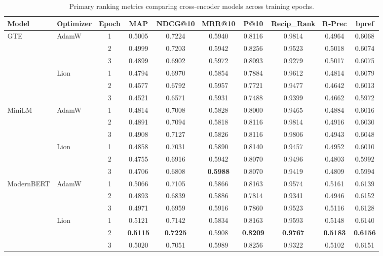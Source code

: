 \documentclass[conference]{IEEEtran}
\begin{document}
\begin{table}[t]
\centering
\caption{Primary ranking metrics comparing cross-encoder models across training epochs.}
\label{tab:primary_metrics}
\small
\begin{tabular}{llcccccccc}
\toprule
\textbf{Model} & \textbf{Optimizer} & \textbf{Epoch} & \textbf{MAP} & \textbf{NDCG@10} & \textbf{MRR@10} & \textbf{P@10} & \textbf{Recip\_Rank} & \textbf{R-Prec} & \textbf{bpref} \\
\midrule
\multirow{6}{*}{GTE} & \multirow{3}{*}{AdamW} 
 & 1 & 0.5005 & 0.7224 & 0.5940 & 0.8116 & 0.9814 & 0.4964 & 0.6068 \\
 & & 2 & 0.4999 & 0.7203 & 0.5942 & 0.8256 & 0.9523 & 0.5018 & 0.6074 \\
 & & 3 & 0.4899 & 0.6902 & 0.5972 & 0.8093 & 0.9279 & 0.5017 & 0.6075 \\
\cmidrule{2-10}
 & \multirow{3}{*}{Lion} 
 & 1 & 0.4794 & 0.6970 & 0.5854 & 0.7884 & 0.9612 & 0.4814 & 0.6079 \\
 & & 2 & 0.4577 & 0.6792 & 0.5957 & 0.7721 & 0.9477 & 0.4642 & 0.6013 \\
 & & 3 & 0.4521 & 0.6571 & 0.5931 & 0.7488 & 0.9399 & 0.4662 & 0.5972 \\
\midrule
\multirow{6}{*}{MiniLM} & \multirow{3}{*}{AdamW} 
 & 1 & 0.4814 & 0.7008 & 0.5828 & 0.8000 & 0.9465 & 0.4884 & 0.6016 \\
 & & 2 & 0.4891 & 0.7094 & 0.5818 & 0.8116 & 0.9814 & 0.4916 & 0.6030 \\
 & & 3 & 0.4908 & 0.7127 & 0.5826 & 0.8116 & 0.9806 & 0.4943 & 0.6048 \\
\cmidrule{2-10}
 & \multirow{3}{*}{Lion} 
 & 1 & 0.4858 & 0.7031 & 0.5890 & 0.8140 & 0.9457 & 0.4952 & 0.6010 \\
 & & 2 & 0.4755 & 0.6916 & 0.5942 & 0.8070 & 0.9496 & 0.4803 & 0.5992 \\
 & & 3 & 0.4706 & 0.6808 & \textbf{0.5988} & 0.8070 & 0.9419 & 0.4809 & 0.5994 \\
\midrule
\multirow{6}{*}{ModernBERT} & \multirow{3}{*}{AdamW} 
 & 1 & 0.5066 & 0.7105 & 0.5866 & 0.8163 & 0.9574 & 0.5161 & 0.6139 \\
 & & 2 & 0.4893 & 0.6839 & 0.5886 & 0.7814 & 0.9341 & 0.4946 & 0.6152 \\
 & & 3 & 0.4971 & 0.6959 & 0.5916 & 0.7860 & 0.9523 & 0.5116 & 0.6128 \\
\cmidrule{2-10}
 & \multirow{3}{*}{Lion} 
 & 1 & 0.5121 & 0.7142 & 0.5834 & 0.8163 & 0.9593 & 0.5148 & 0.6140 \\
 & & 2 & \textbf{0.5115} & \textbf{0.7225} & 0.5908 & \textbf{0.8209} & \textbf{0.9767} & \textbf{0.5183} & \textbf{0.6156} \\
 & & 3 & 0.5020 & 0.7051 & 0.5989 & 0.8256 & 0.9322 & 0.5102 & 0.6151 \\
\bottomrule
\end{tabular}
\end{table}
\end{document}
